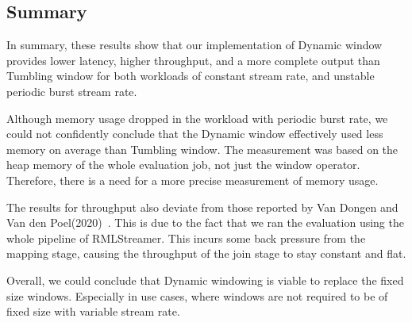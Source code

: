 \begin{table}[htbp]
    \centering
\caption{Tumbling window's completeness measurement. }
\label{tab:tumbling_completeness}
\end{table}


\subsection{Summary}%
\label{sec:Result Summary}

In summary, these results show that our implementation of Dynamic window 
provides lower latency, higher throughput, and a more complete 
output than Tumbling window for both 
workloads of constant stream rate, and unstable periodic burst stream rate.

Although memory usage dropped in the workload with periodic burst rate, we 
could not confidently conclude that the Dynamic window effectively used less memory
on average than Tumbling window. The measurement was based on the heap memory of the 
whole evaluation job, not just the window operator. Therefore, there is a need for a 
more precise measurement of memory usage. 

The results for throughput also deviate from those reported by Van Dongen and Van den Poel(2020)~\cite{evalution_of_spe}. 
This is due to the fact that we ran the evaluation using the whole pipeline of RMLStreamer. This incurs some back pressure from the mapping stage, 
causing the throughput of the join stage to stay constant and flat.    

Overall, we could conclude that Dynamic windowing is viable to replace the fixed size 
windows. Especially in use 
cases, where windows are not required to be of fixed size with variable stream rate.  

